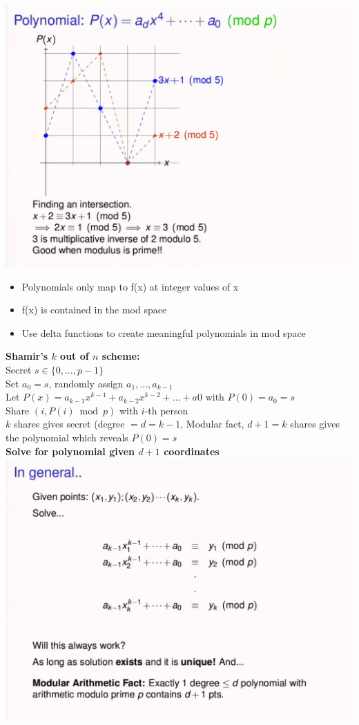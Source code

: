 \documentclass{article}\usepackage{amsmath,amssymb,amsthm,tikz,tkz-graph,color,chngpage,soul,hyperref,csquotes,graphicx,floatrow}\newcommand*{\QEDB}{\hfill\ensuremath{\square}}\newtheorem*{prop}{Proposition}\renewcommand{\theenumi}{\alph{enumi}}\usepackage[shortlabels]{enumitem}\usepackage[nobreak=true]{mdframed}\usetikzlibrary{matrix,calc}\MakeOuterQuote{"}\usepackage[margin=0.75in]{geometry} \newtheorem{theorem}{Theorem}
\begin{document}
\includegraphics{modpoly}\\
\begin{itemize}
    \item Polynomials only map to f(x) at integer values of x
    \item f(x) is contained in the mod space
    \item Use delta functions to create meaningful polynomials in mod space
\end{itemize}
\textbf{Shamir's $k$ out of $n$ scheme:}\\
Secret $s \in \{0, ..., p-1\}$\\
Set $a_0 = s$, randomly assign $a_1, ..., a_{k-1}$\\
Let $P(x) = a_{k-1}x^{k-1} + a_{k-2}x^{k-2} + ... + a0$ with $P(0) = a_0 = s$\\
Share $(i, P(i) \bmod p)$ with $i$-th person\\
$k$ shares gives secret (degree $= d = k-1$, Modular fact, $d+1 = k$ shares gives the polynomial which reveals $P(0) = s$\\
\textbf{Solve for polynomial given $d+1$ coordinates}\\
\includegraphics{genpoly}
\end{document}

